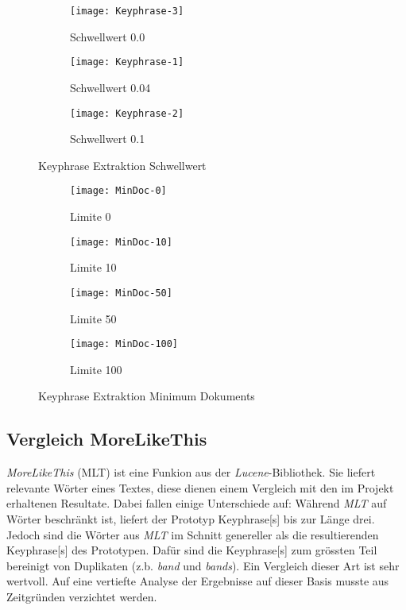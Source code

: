 \begin{figure}[H]
    \centering
    \begin{subfigure}[b]{0.8\textwidth}
    \texttt{[image: Keyphrase-3]}
    \caption{Schwellwert 0.0}
    \end{subfigure}
     \begin{subfigure}[b]{0.8\textwidth}
    \texttt{[image: Keyphrase-1]}
    \caption{Schwellwert 0.04}
    \end{subfigure}
     \begin{subfigure}[b]{0.8\textwidth}
    \texttt{[image: Keyphrase-2]}
    \caption{Schwellwert 0.1}
    \end{subfigure}
    \caption{Keyphrase Extraktion Schwellwert}
    \label{threshold}
\end{figure}

\begin{figure}[H]
    \centering
    \begin{subfigure}[b]{0.8\textwidth}
    \texttt{[image: MinDoc-0]}
    \caption{Limite 0}
    \end{subfigure}
    \begin{subfigure}[b]{0.8\textwidth}
    \texttt{[image: MinDoc-10]}
    \caption{Limite 10}
    \end{subfigure}
    \begin{subfigure}[b]{0.8\textwidth}
    \texttt{[image: MinDoc-50]}
    \caption{Limite 50}
    \end{subfigure}
    \begin{subfigure}[b]{0.8\textwidth}
    \texttt{[image: MinDoc-100]}
    \caption{Limite 100}
    \end{subfigure}
    \caption{Keyphrase Extraktion Minimum Dokuments}
    \label{minidoc}
\end{figure}



\subsection{Vergleich MoreLikeThis}
\textit{MoreLikeThis} (MLT) ist eine Funkion aus der \textit{Lucene}-Bibliothek. Sie liefert relevante Wörter eines Textes, diese dienen einem Vergleich mit den im Projekt erhaltenen Resultate. Dabei fallen einige Unterschiede auf: Während \textit{MLT} auf Wörter beschränkt ist, liefert der Prototyp \gls{Keyphrase}[s] bis zur Länge drei. Jedoch sind die Wörter aus \textit{MLT} im Schnitt genereller als die resultierenden \gls{Keyphrase}[s] des Prototypen. Dafür sind die \gls{Keyphrase}[s] zum grössten Teil bereinigt von Duplikaten (z.b. \textit{band} und \textit{band\grq s}). Ein Vergleich dieser Art ist sehr wertvoll. Auf eine vertiefte Analyse der Ergebnisse auf dieser Basis musste aus Zeitgründen verzichtet werden.
